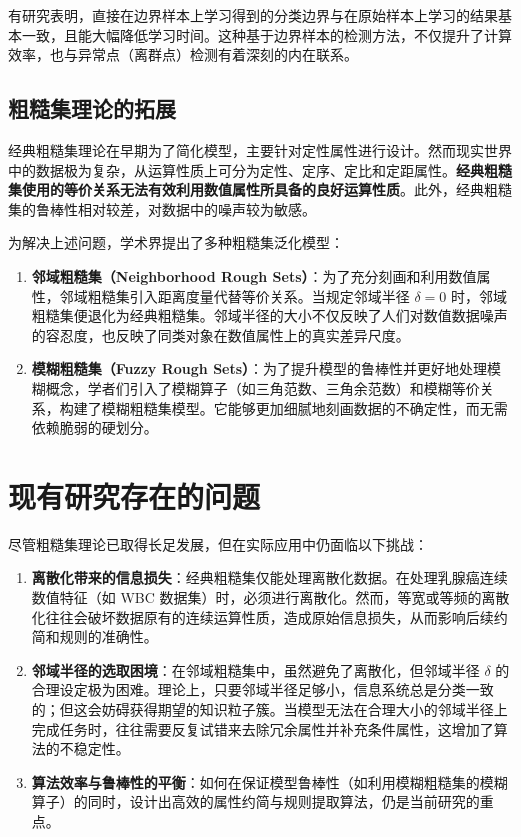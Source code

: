 有研究表明，直接在边界样本上学习得到的分类边界与在原始样本上学习的结果基本一致，且能大幅降低学习时间。这种基于边界样本的检测方法，不仅提升了计算效率，也与异常点（离群点）检测有着深刻的内在联系。

\subsection{粗糙集理论的拓展}
经典粗糙集理论在早期为了简化模型，主要针对定性属性进行设计。然而现实世界中的数据极为复杂，从运算性质上可分为定性、定序、定比和定距属性。\textbf{经典粗糙集使用的等价关系无法有效利用数值属性所具备的良好运算性质}。此外，经典粗糙集的鲁棒性相对较差，对数据中的噪声较为敏感。

为解决上述问题，学术界提出了多种粗糙集泛化模型：
\begin{enumerate}
	\item \textbf{邻域粗糙集（Neighborhood Rough Sets）}：为了充分刻画和利用数值属性，邻域粗糙集引入距离度量代替等价关系。当规定邻域半径 \(\delta=0\) 时，邻域粗糙集便退化为经典粗糙集。邻域半径的大小不仅反映了人们对数值数据噪声的容忍度，也反映了同类对象在数值属性上的真实差异尺度。
	\item \textbf{模糊粗糙集（Fuzzy Rough Sets）}：为了提升模型的鲁棒性并更好地处理模糊概念，学者们引入了模糊算子（如三角范数、三角余范数）和模糊等价关系，构建了模糊粗糙集模型。它能够更加细腻地刻画数据的不确定性，而无需依赖脆弱的硬划分。
\end{enumerate}

\section{现有研究存在的问题}

尽管粗糙集理论已取得长足发展，但在实际应用中仍面临以下挑战：
\begin{enumerate}
	\item \textbf{离散化带来的信息损失}：经典粗糙集仅能处理离散化数据。在处理乳腺癌连续数值特征（如 WBC 数据集）时，必须进行离散化。然而，等宽或等频的离散化往往会破坏数据原有的连续运算性质，造成原始信息损失，从而影响后续约简和规则的准确性。
	\item \textbf{邻域半径的选取困境}：在邻域粗糙集中，虽然避免了离散化，但邻域半径 \(\delta\) 的合理设定极为困难。理论上，只要邻域半径足够小，信息系统总是分类一致的；但这会妨碍获得期望的知识粒子簇。当模型无法在合理大小的邻域半径上完成任务时，往往需要反复试错来去除冗余属性并补充条件属性，这增加了算法的不稳定性。
	\item \textbf{算法效率与鲁棒性的平衡}：如何在保证模型鲁棒性（如利用模糊粗糙集的模糊算子）的同时，设计出高效的属性约简与规则提取算法，仍是当前研究的重点。
\end{enumerate}

